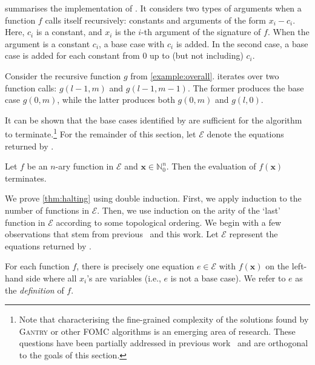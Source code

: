 \documentclass[a4paper,UKenglish,cleveref, autoref, thm-restate]{lipics-v2021}
\newcommand{\Cranetwo}{\textsc{Gantry}}
\begin{document}
 summarises the implementation of \FindBaseCases. It
considers two types of arguments when a function $f$ calls itself recursively:
constants and arguments of the form $x_{i} - c_{i}$. Here, $c_{i}$ is a
constant, and $x_{i}$ is the $i$-th argument of the signature of $f$. When the
argument is a constant $c_{i}$, a base case with $c_{i}$ is added. In the second
case, a base case is added for each constant from $0$ up to (but not including)
$c_{i}$.

\begin{example}
  Consider the recursive function $g$ from \cref{example:overall}.
  \FindBaseCases iterates over two function calls: $g(l-1, m)$ and
  $g(l-1, m-1)$. The former produces the base case $g(0, m)$, while the latter
  produces both $g(0, m)$ and $g(l, 0)$.
\end{example}

It can be shown that the base cases identified by \FindBaseCases are sufficient
for the algorithm to terminate.\footnote{Note that characterising the
  fine-grained complexity of the solutions found by \Cranetwo{} or other FOMC
  algorithms is an emerging area of research. These questions have been
  partially addressed in previous
  work~\cite{DBLP:conf/kr/DilkasB23,tóth2024complexityweightedfirstordermodel}
  and are orthogonal to the goals of this section.} For the remainder of this
section, let $\mathcal{E}$ denote the equations returned by
\CompileWithBaseCases.

\begin{theorem}[Termination]\label{thm:halting}
  Let $f$ be an $n$-ary function in $\mathcal{E}$ and
  $\mathbf{x} \in \mathbb{N}_{0}^{n}$. Then the evaluation of $f(\mathbf{x})$
  terminates.
\end{theorem}

We prove \cref{thm:halting} using double induction. First, we apply induction to
the number of functions in $\mathcal{E}$. Then, we use induction on the arity of
the `last' function in $\mathcal{E}$ according to some topological ordering. We
begin with a few observations that stem from
previous~\cite{DBLP:conf/kr/DilkasB23,DBLP:conf/ijcai/BroeckTMDR11} and this
work. Let $\mathcal{E}$ represent the equations returned by
\CompileWithBaseCases.

\begin{observation}\label{assumption1}
  For each function $f$, there is precisely one equation $e \in \mathcal{E}$
  with $f(\mathbf{x})$ on the left-hand side where all $x_{i}$'s are variables
  (i.e., $e$ is not a base case). We refer to $e$ as the \emph{definition} of
  $f$.
\end{observation}
\end{document}

